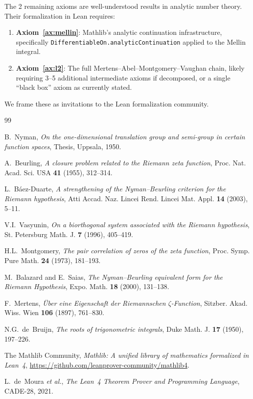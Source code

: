 \documentclass[11pt,a4paper]{article}
\theoremstyle{plain}
\theoremstyle{definition}
\theoremstyle{remark}
\newcommand{\lean}[1]{\texttt{#1}}
\begin{document}
The 2 remaining axioms are well-understood results in analytic number
theory. Their formalization in Lean requires:
\begin{enumerate}
  \item \textbf{Axiom~\ref{ax:mellin}}: Mathlib's analytic continuation
    infrastructure, specifically \lean{DifferentiableOn.analyticContinuation}
    applied to the Mellin integral.
  \item \textbf{Axiom~\ref{ax:l2}}: The full Mertens--Abel--Montgomery--Vaughan
    chain, likely requiring 3--5 additional intermediate axioms if
    decomposed, or a single ``black box'' axiom as currently stated.
\end{enumerate}

We frame these as invitations to the Lean formalization community.

\begin{thebibliography}{99}

B.~Nyman, \emph{On the one-dimensional translation group and semi-group in
certain function spaces}, Thesis, Uppsala, 1950.

A.~Beurling, \emph{A closure problem related to the Riemann zeta function},
Proc. Nat. Acad. Sci. USA \textbf{41} (1955), 312--314.

L.~B\'aez-Duarte, \emph{A strengthening of the Nyman--Beurling criterion for
the Riemann hypothesis}, Atti Accad. Naz. Lincei Rend. Lincei Mat. Appl.
\textbf{14} (2003), 5--11.

V.I.~Vasyunin, \emph{On a biorthogonal system associated with the Riemann
hypothesis}, St. Petersburg Math. J. \textbf{7} (1996), 405--419.

H.L.~Montgomery, \emph{The pair correlation of zeros of the zeta function},
Proc. Symp. Pure Math. \textbf{24} (1973), 181--193.

M.~Balazard and E.~Saias, \emph{The Nyman--Beurling equivalent form for the
Riemann Hypothesis}, Expo. Math. \textbf{18} (2000), 131--138.

F.~Mertens, \emph{\"Uber eine Eigenschaft der Riemannschen $\zeta$-Function},
Sitzber. Akad. Wiss. Wien \textbf{106} (1897), 761--830.

N.G.~de~Bruijn, \emph{The roots of trigonometric integrals},
Duke Math. J. \textbf{17} (1950), 197--226.

The Mathlib Community, \emph{Mathlib: A unified library of mathematics
formalized in Lean~4}, \url{https://github.com/leanprover-community/mathlib4}.

L.~de~Moura \emph{et al.}, \emph{The Lean~4 Theorem Prover and Programming
Language}, CADE-28, 2021.

\end{thebibliography}
\end{document}
